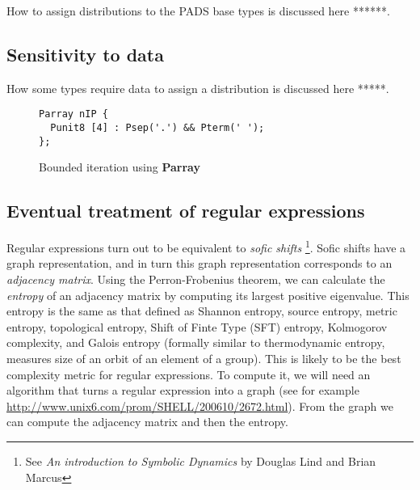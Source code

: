 How to assign distributions to the PADS base types is discussed here ******.

\subsection{Sensitivity to data}

How some types require data to assign a distribution is discussed here *****.

\begin{figure}
\label{fig:Parray1}
\begin{verbatim}
Parray nIP {
  Punit8 [4] : Psep('.') && Pterm(' ');
};
\end{verbatim}
\caption{Bounded iteration using \textbf{Parray}}
\end{figure}

\subsection{Eventual treatment of regular expressions}

Regular expressions turn out to be equivalent to \textit{sofic shifts}
\footnote{See \textit{An introduction to Symbolic Dynamics} by
Douglas Lind and Brian Marcus}. Sofic shifts have a graph representation,
and in turn this graph representation corresponds to an
\textit{adjacency matrix}. Using the Perron-Frobenius theorem,
we can calculate the \textit{entropy} of an adjacency matrix by
computing its largest positive eigenvalue. This entropy is the same as
that defined as Shannon entropy, source entropy, metric entropy,
topological entropy, Shift of Finte Type (SFT) entropy, Kolmogorov
complexity, and Galois entropy (formally similar to thermodynamic
entropy, measures size of an orbit of an element of a group). This is
likely to be the best complexity metric for regular expressions.  To
compute it, we will need an algorithm that turns a regular expression
into a graph (see for example
\url{http://www.unix6.com/prom/SHELL/200610/2672.html}).
From the graph we can compute the adjacency matrix and then the
entropy.
